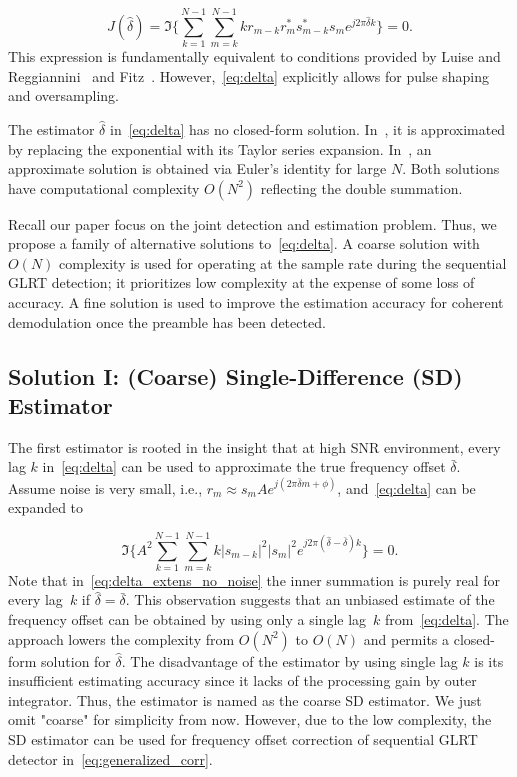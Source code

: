 \begin{equation}
    \label{eq:delta}
    J(\hat{\delta}) = \Im\bigg\{\sum_{k=1}^{N-1}{\sum_{m=k}^{N-1}{kr_{m-k}r_m^{*}s_{m-k}^{*}s_m}e^{j2\pi\hat{\delta}k}}\bigg\}=0.
    \end{equation}
This expression is fundamentally equivalent to conditions provided by Luise and Reggiannini~\cite{Luise_Reggiannini_95} and Fitz~\cite{Fitz_94}.
However,~\eqref{eq:delta} explicitly allows for pulse shaping and oversampling.

The estimator $\hat{\delta}$ in~\eqref{eq:delta} has no closed-form
solution.
In~\cite{Luise_Reggiannini_95}, it is approximated by replacing the exponential with its
Taylor series expansion.
In~\cite{Fitz_94}, an approximate solution is obtained via Euler's
identity for large $N$.
Both solutions have computational complexity $O(N^2)$ reflecting the
double summation.

Recall our paper focus on the joint detection and estimation problem. Thus, we propose a family of alternative solutions to~\eqref{eq:delta}.
A coarse solution with $O(N)$ complexity is used for operating at the sample
rate during the sequential GLRT detection;
it prioritizes low complexity at the expense of some loss of accuracy.
A fine solution is used to improve the estimation accuracy for coherent demodulation once the preamble has been detected.

\subsection{Solution I: (Coarse) Single-Difference (SD) Estimator}

The first estimator is rooted in the insight that at high SNR environment, every lag $k$ in~\eqref{eq:delta} can be used to
approximate the true frequency offset $\bar{\delta}$. Assume noise is very small, i.e.,
$r_m \approx s_mAe^{j(2\pi \bar{\delta} m+\phi)}$, and~\eqref{eq:delta} can be expanded to

\begin{equation}
    \label{eq:delta_extens_no_noise}
    \Im\bigg\{A^2\sum_{k=1}^{N-1}\sum_{m=k}^{N-1}k|s_{m-k}|^2|s_m|^2e^{j2\pi (\hat{\delta}-\bar{\delta})k}\bigg\}=0.
    \end{equation}
Note that in~\eqref{eq:delta_extens_no_noise} the inner summation is purely real for every lag~$k$ if $\hat{\delta}=\bar{\delta}$.
This observation suggests that an unbiased estimate of the frequency offset can be obtained by using only a single lag~$k$
from~\eqref{eq:delta}. The approach lowers the complexity from $O(N^2)$ to $O(N)$ and permits a closed-form solution for $\hat{\delta}$.  
The disadvantage of the estimator by using single lag $k$ is its insufficient estimating accuracy since it lacks of the processing gain by outer integrator.
Thus, the estimator is named as the coarse SD estimator. We just omit "coarse" for simplicity from now.
However, due to the low complexity, the SD estimator can be used for 
frequency offset correction of sequential GLRT detector in~\eqref{eq:generalized_corr}. 

